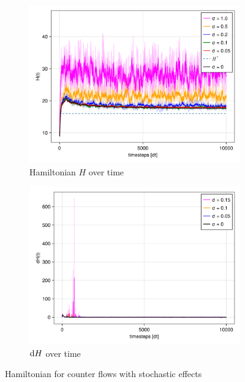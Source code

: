 \begin{itemize}
    \begin{figure}[H]
        \centering
        \begin{subfigure}{.49\textwidth}
            \centering
            \includegraphics[width=\linewidth]{figures/ch5_collective_stoch/H_stochasic_counter.png}
            \caption{Hamiltonian $H$ over time}
            \label{plot:stoc_counter_h}
        \end{subfigure}
        \begin{subfigure}{.49\textwidth}
            \centering
            \includegraphics[width=\linewidth]{figures/ch5_collective_stoch/dH_stochasic_counter.png}
            \caption{$\mathrm d H$ over time}
            \label{plot:stoc_counter_dh}
        \end{subfigure}
        \caption{Hamiltonian for counter flows with stochastic effects}
        \label{plot:stoc_counter_hamiltonian}
    \end{figure}

\end{itemize}

